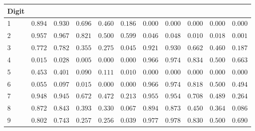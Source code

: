 \begin{table}[!tbp]
\begin{center}
\begin{tabular}{lrrrrrrrrrr}
\hline\hline
\multicolumn{1}{l}{Digit}&\multicolumn{1}{c}{}&\multicolumn{1}{c}{}&\multicolumn{1}{c}{}&\multicolumn{1}{c}{}&\multicolumn{1}{c}{}&\multicolumn{1}{c}{}&\multicolumn{1}{c}{}&\multicolumn{1}{c}{}&\multicolumn{1}{c}{}&\multicolumn{1}{c}{}\tabularnewline
\hline
1&$0.894$&$0.930$&$0.696$&$0.460$&$0.186$&$0.000$&$0.000$&$0.000$&$0.000$&$0.000$\tabularnewline
2&$0.957$&$0.967$&$0.821$&$0.500$&$0.599$&$0.046$&$0.048$&$0.010$&$0.018$&$0.001$\tabularnewline
3&$0.772$&$0.782$&$0.355$&$0.275$&$0.045$&$0.921$&$0.930$&$0.662$&$0.460$&$0.187$\tabularnewline
4&$0.015$&$0.028$&$0.005$&$0.000$&$0.000$&$0.966$&$0.974$&$0.834$&$0.500$&$0.663$\tabularnewline
5&$0.453$&$0.401$&$0.090$&$0.111$&$0.010$&$0.000$&$0.000$&$0.000$&$0.000$&$0.000$\tabularnewline
6&$0.055$&$0.097$&$0.015$&$0.000$&$0.000$&$0.966$&$0.974$&$0.818$&$0.500$&$0.494$\tabularnewline
7&$0.948$&$0.945$&$0.672$&$0.472$&$0.213$&$0.955$&$0.954$&$0.708$&$0.489$&$0.264$\tabularnewline
8&$0.872$&$0.843$&$0.393$&$0.330$&$0.067$&$0.894$&$0.873$&$0.450$&$0.364$&$0.086$\tabularnewline
9&$0.802$&$0.743$&$0.257$&$0.256$&$0.039$&$0.977$&$0.978$&$0.830$&$0.500$&$0.690$\tabularnewline
\hline
\end{tabular}\end{center}
\end{table}

